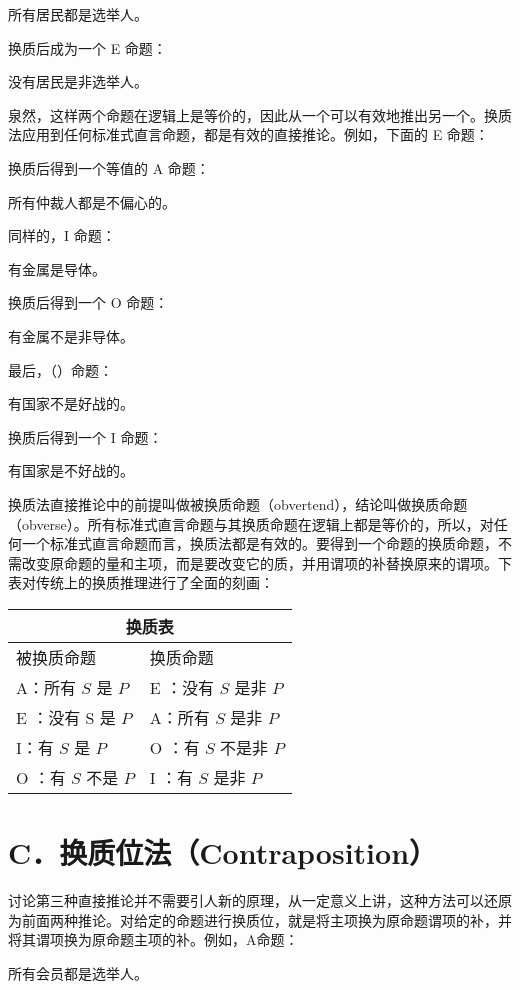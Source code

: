 所有居民都是选举人。

换质后成为一个 E 命题：

没有居民是非选举人。

泉然，这样两个命题在逻辑上是等价的，因此从一个可以有效地推出另一个。换质法应用到任何标准式直言命题，都是有效的直接推论。例如，下面的 E 命题：

换质后得到一个等值的 A 命题：

所有仲裁人都是不偏心的。

同样的，I 命题：

有金属是导体。

换质后得到一个 O 命题：

有金属不是非导体。

最后，（）命题：

有国家不是好战的。

换质后得到一个 I 命题：

有国家是不好战的。

换质法直接推论中的前提叫做被换质命题（obvertend），结论叫做换质命题（obverse）。所有标准式直言命题与其换质命题在逻辑上都是等价的，所以，对任何一个标准式直言命题而言，换质法都是有效的。要得到一个命题的换质命题，不需改变原命题的量和主项，而是要改变它的质，并用谓项的补替换原来的谓项。下表对传统上的换质推理进行了全面的刻画：

\begin{center}
\begin{tabular}{|l|l|}
\hline
\multicolumn{2}{|c|}{换质表} \\
\hline
被换质命题 & 换质命题 \\
\hline
A：所有 $S$ 是 $P$ & E ：没有 $S$ 是非 $P$ \\
\hline
E ：没有 S 是 $P$ & A：所有 $S$ 是非 $P$ \\
\hline
I：有 $S$ 是 $P$ & O ：有 $S$ 不是非 $P$ \\
\hline
O ：有 $S$ 不是 $P$ & I ：有 $S$ 是非 $P$ \\
\hline
\end{tabular}
\end{center}

\section*{C．换质位法（Contraposition）}
讨论第三种直接推论并不需要引人新的原理，从一定意义上讲，这种方法可以还原为前面两种推论。对给定的命题进行换质位，就是将主项换为原命题谓项的补，并将其谓项换为原命题主项的补。例如，A命题：

所有会员都是选举人。

